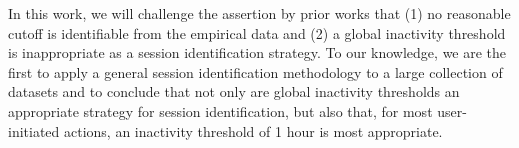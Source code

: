 In this work, we will challenge the assertion by prior works that (1) no reasonable cutoff is identifiable from the empirical data and (2) a global inactivity threshold is inappropriate as a session identification strategy.  To our knowledge, we are the first to apply a general session identification methodology to a large collection of datasets and to conclude that not only are global inactivity thresholds an appropriate strategy for session identification, but also that, for most user-initiated actions, an inactivity threshold of 1 hour is most appropriate.
